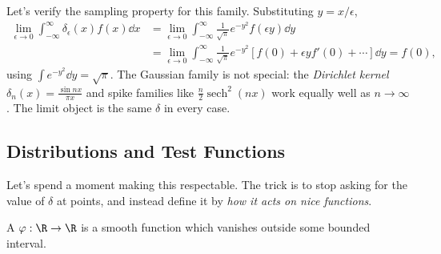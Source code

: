 \begin{center}
\end{center}

Let's verify the sampling property for this family. Substituting $y = x/\epsilon$,
\begin{align*}
    \lim_{\epsilon \to 0}\int_{-\infty}^{\infty} \delta_\epsilon(x) f(x) \dd x
    &= \lim_{\epsilon \to 0} \int_{-\infty}^{\infty} \frac{1}{\sqrt{\pi}} e^{-y^2} f(\epsilon y) \dd y \\
    &= \lim_{\epsilon \to 0}\int_{-\infty}^{\infty} \frac{1}{\sqrt{\pi}} e^{-y^2}\left[f(0) + \epsilon y f'(0) + \cdots \right] \dd y = f(0),
\end{align*}
using $\int e^{-y^2} \dd y = \sqrt{\pi}$. The Gaussian family is not special: the \emph{Dirichlet kernel} $\delta_n(x) = \frac{\sin nx}{\pi x}$ and spike families like $\frac{n}{2}\operatorname{sech}^2 (nx)$ work equally well as $n \to \infty$. The limit object is the same $\delta$ in every case.

\subsection{Distributions and Test Functions}

Let's spend a moment making this respectable. The trick is to stop asking for the value of $\delta$ at points, and instead define it by \emph{how it acts on nice functions}.

\begin{definition}
    A  $\varphi : \R \rightarrow \R$ is a smooth function which vanishes outside some bounded interval.
\end{definition}

